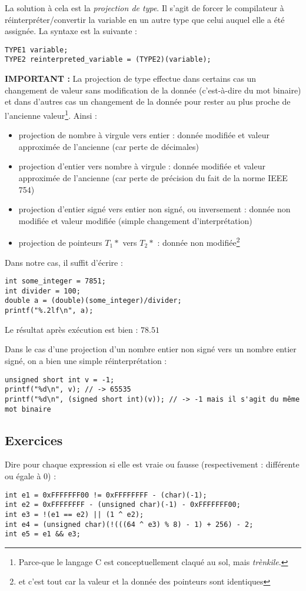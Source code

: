\documentclass[../../../main.tex]{subfiles}
\begin{document}
La solution à cela est la \textit{projection de type}. Il s'agit de forcer le compilateur à réinterpréter/convertir la variable en un autre type que celui auquel elle a été assignée. La syntaxe est la suivante :
\begin{verbatim}
TYPE1 variable;
TYPE2 reinterpreted_variable = (TYPE2)(variable);
\end{verbatim}
\textbf{IMPORTANT :} La projection de type effectue dans certains cas un changement de valeur sans modification de la donnée (c'est-à-dire du mot binaire) et dans d'autres cas un changement de la donnée pour rester au plus proche de l'ancienne valeur\footnote{Parce-que le langage C est conceptuellement claqué au sol, mais \textit{trènkile}.}. Ainsi :
\begin{itemize}
	\item projection de nombre à virgule vers entier : donnée modifiée et valeur approximée de l'ancienne (car perte de décimales)
	\item projection d'entier vers nombre à virgule : donnée modifiée et valeur approximée de l'ancienne (car perte de précision du fait de la norme IEEE 754)
	\item projection d'entier signé vers entier non signé, ou inversement : donnée non modifiée et valeur modifiée (simple changement d'interprétation)
	\item projection de pointeurs $T_1*$ vers $T_2*$ : donnée non modifiée\footnote{et c'est tout car la valeur et la donnée des pointeurs sont identiques}
\end{itemize}
Dans notre cas, il suffit d'écrire :
\begin{verbatim}
int some_integer = 7851;
int divider = 100;
double a = (double)(some_integer)/divider;
printf("%.2lf\n", a);
\end{verbatim}
Le résultat après exécution est bien : $78.51$

Dans le cas d'une projection d'un nombre entier non signé vers un nombre entier signé, on  a bien une simple réinterprétation : 
\begin{verbatim}
unsigned short int v = -1;
printf("%d\n", v); // -> 65535
printf("%d\n", (signed short int)(v)); // -> -1 mais il s'agit du même mot binaire
\end{verbatim}
\subsection{Exercices}
\newline
Dire pour chaque expression si elle est vraie ou fausse (respectivement : différente ou égale à 0) :
\begin{verbatim}
int e1 = 0xFFFFFFF00 != 0xFFFFFFFF - (char)(-1);
int e2 = 0xFFFFFFFF - (unsigned char)(-1) - 0xFFFFFFF00;
int e3 = !(e1 == e2) || (1 ^ e2);
int e4 = (unsigned char)(!(((64 ^ e3) % 8) - 1) + 256) - 2;
int e5 = e1 && e3;
\end{verbatim}
\end{document}
